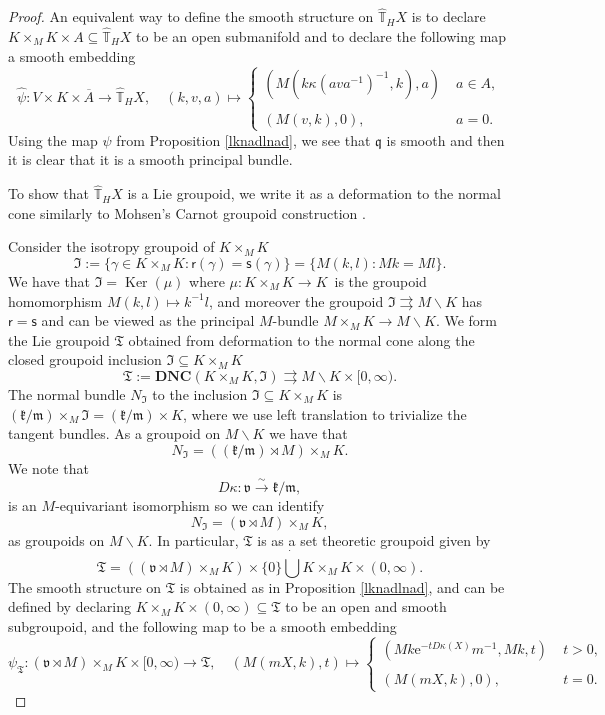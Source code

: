 \documentclass[a4paper,reqno]{amsart}
\numberwithin{equation}{section}
\def\ker{\operatorname{Ker}}
\theoremstyle{definition}
\theoremstyle{remark}
\begin{document}
\begin{proof}
An equivalent way to define the smooth structure on $\widehat{\mathbb{T}}_HX$ is to declare $K\times_MK\times A\subseteq \widehat{\mathbb{T}}_HX$ to be an open submanifold and to declare the following map a smooth embedding 
\begin{equation}
\label{psihatdef}
\hat{\psi}:V\times K\times \overline{A}\to \widehat{\mathbb{T}}_HX, 
\quad
(k,v,a)\mapsto\begin{cases}
(M(k\kappa(ava^{-1})^{-1},k),a)\; &a\in A,\\
{}\\
(M(v,k),0),\; &a=0.
\end{cases}
\end{equation}
Using the map $\psi$ from Proposition \ref{lknadlnad}, we see that $\mathfrak{q}$ is smooth and then it is clear that it is a smooth principal bundle. 

To show that $\widehat{\mathbb{T}}_HX$ is a Lie groupoid, we write it as a deformation to the normal cone similarly to Mohsen's Carnot groupoid construction \cite[Section 2 and 3]{mohsendef}. 

Consider the isotropy groupoid of $K\times_MK$
$$\mathfrak{I}:=\{\gamma\in K\times_MK: \mathsf{r}(\gamma)=\mathsf{s}(\gamma)\}= \{M(k,l): Mk=Ml\}.$$
We have that $\mathfrak{I}=\ker(\mu)$ where $\mu:K\times_MK\to K$ is the groupoid homomorphism $M(k,l)\mapsto k^{-1}l$, and moreover the groupoid $\mathfrak{I}\rightrightarrows M\backslash K$ has $\mathsf{r}=\mathsf{s}$ and can be viewed as the principal $M$-bundle $M\times_MK\to M\backslash K$. We form the Lie groupoid $\mathfrak{T}$ obtained from deformation to the normal cone along the closed groupoid inclusion $\mathfrak{I}\subseteq K\times_MK$
$$\mathfrak{T}:=\pmb{DNC}(K\times_MK,\mathfrak{I})\rightrightarrows M\backslash K\times [0,\infty).$$
The normal bundle $N_\mathfrak{I}$ to the inclusion $\mathfrak{I}\subseteq K\times_MK$ is $(\mathfrak{k}/\mathfrak{m})\times_M\mathfrak{I}=(\mathfrak{k}/\mathfrak{m})\times K$, where we use left translation to trivialize the tangent bundles. As a groupoid on $M\backslash K$ we have that 
$$N_\mathfrak{I}=((\mathfrak{k}/\mathfrak{m})\rtimes M)\times_M K.$$
We note that 
$$D\kappa:\mathfrak{v}\xrightarrow{\sim} \mathfrak{k}/\mathfrak{m},$$
is an $M$-equivariant isomorphism so we can identify 
$$N_\mathfrak{I}=(\mathfrak{v}\rtimes M)\times _M K,$$ 
as groupoids on $M\backslash K$. In particular,  $\mathfrak{T}$ is as a set theoretic groupoid given by  
$$\mathfrak{T}=((\mathfrak{v}\rtimes M)\times _M K)\times\{0\}\dot{\bigcup} K\times_M K\times (0,\infty).$$
The smooth structure on $\mathfrak{T}$ is obtained as in Proposition \ref{lknadlnad}, and can be defined by declaring $K\times_M K\times (0,\infty)\subseteq \mathfrak{T}$ to be an open and smooth subgroupoid, and the following map to be a smooth embedding 
$$\psi_\mathfrak{T}:(\mathfrak{v}\rtimes M)\times_M K\times [0,\infty)\to \mathfrak{T}, 
\quad 
(M(mX,k),t)\mapsto\begin{cases}
(Mk\mathrm{e}^{-tD\kappa(X)}m^{-1},Mk,t)\; &t>0,\\
{}\\
(M(mX,k),0),\; &t=0.
\end{cases}$$


\end{proof}
\end{document}
